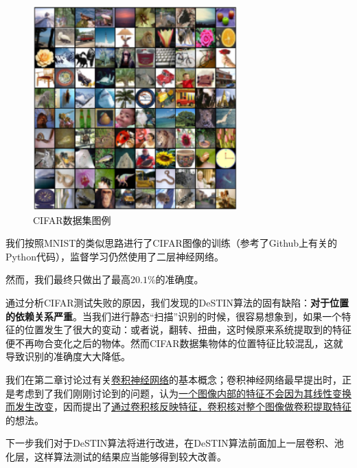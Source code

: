 \begin{figure}[htbp]
   \centering
   \includegraphics[width=0.7\textwidth]{cifar.png} %
   \caption{CIFAR数据集图例}
   \label{fig:cifar}
\end{figure}

我们按照MNIST的类似思路进行了CIFAR图像的训练（参考了Github上有关的Python代码\cite{pythonDeSTIN}），监督学习仍然使用了二层神经网络。

然而，我们最终只做出了最高$20.1\%$的准确度。

通过分析CIFAR测试失败的原因，我们发现的DeSTIN算法的固有缺陷：\textbf{对于位置的依赖关系严重}。当我们进行静态“扫描”识别的时候，很容易想象到，如果一个特征的位置发生了很大的变动：或者说，翻转、扭曲，这时候原来系统提取到的特征便不再吻合变化之后的物体。然而CIFAR数据集物体的位置特征比较混乱，这就导致识别的准确度大大降低。

我们在第二章讨论过有关\uline{卷积神经网络}的基本概念；卷积神经网络最早提出时，正是考虑到了我们刚刚讨论到的问题，认为\uline{一个图像内部的特征不会因为其线性变换而发生改变}，因而提出了\uline{通过卷积核反映特征，卷积核对整个图像做卷积提取特征}的想法。

下一步我们对于DeSTIN算法将进行改进，在DeSTIN算法前面加上一层卷积、池化层，这样算法测试的结果应当能够得到较大改善。

%